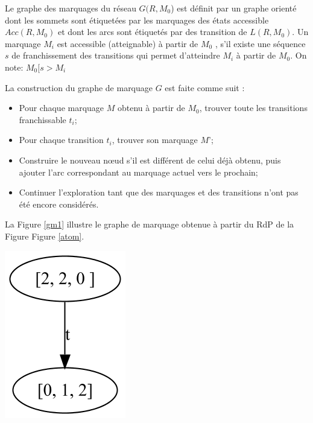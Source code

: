  
\begin{definition}
Le graphe des marquages du réseau $G(R, M_0 $) est définit par un graphe orienté dont les sommets sont étiquetées par les marquages des états accessible $Acc(R, M_0 )$ et dont les arcs sont étiquetés par des transition de $L(R, M_0 )$.
Un marquage $M_i$  est accessible (atteignable) à partir de $M_0$ , s'il existe une séquence $s$ de franchissement des transitions qui permet d'atteindre $M_i$  à partir de $M_0$. On note: $M_0  [s > M_i  $


La construction du graphe de marquage $G$ est faite comme suit \citep{SaidounicoursRdp2017}:
\begin{itemize}
	\item Pour chaque marquage $M$ obtenu à partir de $M_0$, trouver toute les transitions franchissable $t_i$;
	\item Pour chaque transition $t_i$, trouver son marquage $M’$;
	\item Construire le nouveau nœud s'il est différent de celui déjà obtenu, puis ajouter l'arc correspondant au marquage actuel vers le prochain;
	\item Continuer l'exploration tant que des marquages et des transitions n'ont pas été encore considérés.
\end{itemize}
La Figure \ref{gm1} illustre le graphe de marquage obtenue à partir du RdP de la Figure Figure \ref{atom}.
\begin{center}
	\includegraphics[scale=0.4]{img/gm1.png}
	 \label{gm1}
 \end{center}
\end{definition}

